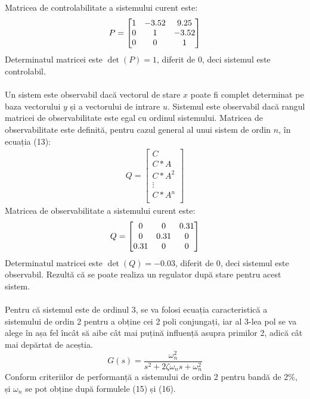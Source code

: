 \documentclass[11pt]{article}
\begin{document}
Matricea de controlabilitate a sistemului curent este:
\begin{align}
P=\begin{bmatrix}
	1       & -3.52 & 9.25\notag\\
	0       & 1 & -3.52\notag\\
	0      & 0 & 1\notag
\end{bmatrix}
\end{align}
Determinatul matricei este $\det(P) = 1$, diferit de 0, deci sistemul este controlabil.\\
\\
Un sistem este observabil dacă vectorul de stare $x$ poate fi complet determinat pe baza vectorului $y$ și a vectorului de intrare $u$.
Sistemul este observabil dacă rangul matricei de observabilitate este egal cu ordinul sistemului.
Matricea de observabilitate este definită, pentru cazul general al unui sistem de ordin $n$, în ecuația (13):
\begin{align}
Q=
\begin{bmatrix}
C \\ 
C\ast A \\
C\ast A^2 \\
\vdots\\
C\ast A^n\\
\end{bmatrix}
\end{align}
Matricea de observabilitate a sistemului curent este:
\begin{align}
Q=\begin{bmatrix}
0       & 0 & 0.31\notag\\
0       & 0.31 & 0\notag\\
0.31      & 0 & 0\notag
\end{bmatrix}
\end{align}
Determinatul matricei este $\det(Q) =-0.03$, diferit de 0, deci sistemul este observabil.
Rezultă că se poate realiza un regulator după stare pentru acest sistem.\\\\
Pentru că sistemul este de ordinul 3, se va folosi ecuația caracteristică a sistemului de ordin 2 pentru a obține
cei 2 poli conjungați, iar al 3-lea pol se va alege în așa fel încât să aibe cât mai puțină influență asupra primilor
2, adică cât mai depărtat de aceștia.
\begin{equation}
G(s)=\frac{\omega_{n}^2}{s^2+2\zeta\omega_ns+\omega_{n}^2}
\end{equation}
Conform criteriilor de performanță a sistemului de ordin 2 pentru bandă de 2\%, și $\omega_{n}$ se pot obține după formulele (15) și (16).
\end{document}
